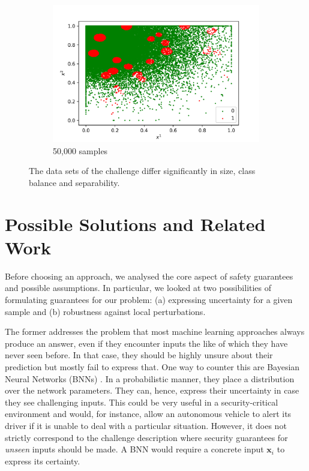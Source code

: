 \documentclass[acmsmall,nonacm]{acmart}
\begin{document}
\begin{figure}
\begin{subfigure}{.32\textwidth}
\end{subfigure}
\begin{subfigure}{.32\textwidth}
  \centering
  \includegraphics[width=\textwidth]{assets/ds_c.png}
  \caption{50,000 samples}
\end{subfigure}
\caption{The data sets of the challenge differ significantly in size, class balance and separability.}
\label{fig:datasets}
\end{figure}


\section{Possible Solutions and Related Work}

Before choosing an approach, we analysed the core aspect of safety guarantees and possible assumptions. In particular, we looked at two possibilities of formulating guarantees for our problem: (a) expressing uncertainty for a given sample and (b) robustness against local perturbations. 

The former addresses the problem that most machine learning approaches always produce an answer, even if they encounter inputs the like of which they have never seen before. In that case, they should be highly unsure about their prediction but mostly fail to express that. One way to counter this are Bayesian Neural Networks (BNNs) \cite{goan2020bnn}. In a probabilistic manner, they place a distribution over the network parameters. They can, hence, express their uncertainty in case they see challenging inputs. This could be very useful in a security-critical environment and would, for instance, allow an autonomous vehicle to alert its driver if it is unable to deal with a particular situation. However, it does not strictly correspond to the challenge description where security guarantees for \textit{unseen} inputs should be made. A BNN would require a concrete input $\mathbf{x}_i$ to express its certainty.
\end{document}
